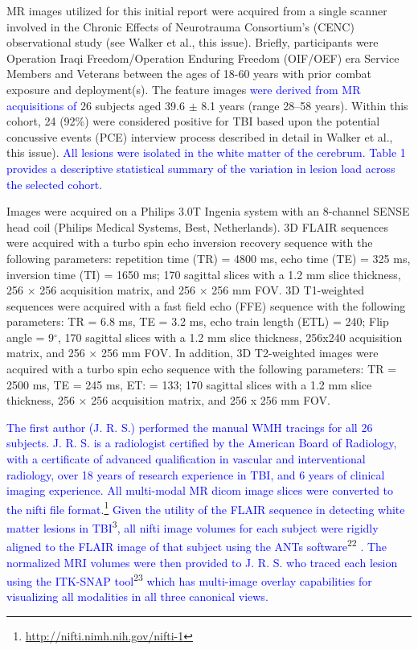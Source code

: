 \documentclass[11pt,]{article}
\let\rmarkdownfootnote\footnote%
\def\footnote{\protect\rmarkdownfootnote}
\begin{document}
MR images utilized for this initial report were acquired from a single
scanner involved in the Chronic Effects of Neurotrauma Consortium's
(CENC) observational study (see Walker et al., this issue). Briefly,
participants were Operation Iraqi Freedom/Operation Enduring Freedom
(OIF/OEF) era Service Members and Veterans between the ages of 18-60
years with prior combat exposure and deployment(s). The feature images
\textcolor{blue}{were derived from MR acquisitions of} 26 subjects aged
39.6 \(\pm\) 8.1 years (range 28--58 years). Within this cohort, 24
(92\%) were considered positive for TBI based upon the potential
concussive events (PCE) interview process described in detail in Walker
et al., this issue).
\textcolor{blue}{All lesions were isolated in the white matter of the cerebrum.  Table 1 provides a descriptive statistical summary of the variation in lesion
load across the selected cohort.}

Images were acquired on a Philips 3.0T Ingenia system with an 8-channel
SENSE head coil (Philips Medical Systems, Best, Netherlands). 3D FLAIR
sequences were acquired with a turbo spin echo inversion recovery
sequence with the following parameters: repetition time (TR) = 4800 ms,
echo time (TE) = 325 ms, inversion time (TI) = 1650 ms; 170 sagittal
slices with a 1.2 mm slice thickness, 256 \(\times\) 256 acquisition
matrix, and 256 \(\times\) 256 mm FOV. 3D T1-weighted sequences were
acquired with a fast field echo (FFE) sequence with the following
parameters: TR = 6.8 ms, TE = 3.2 ms, echo train length (ETL) = 240;
Flip angle = 9\(^\circ\), 170 sagittal slices with a 1.2 mm slice
thickness, 256x240 acquisition matrix, and 256 \(\times\) 256 mm FOV. In
addition, 3D T2-weighted images were acquired with a turbo spin echo
sequence with the following parameters: TR = 2500 ms, TE = 245 ms, ET: =
133; 170 sagittal slices with a 1.2 mm slice thickness, 256 \(\times\)
256 acquisition matrix, and 256 x 256 mm FOV.

\textcolor{blue}{The first author (J. R. S.) performed the manual WMH tracings for all 26
subjects.  J. R. S. is a radiologist certified by the American Board of Radiology, with a certificate of advanced qualification in vascular and interventional radiology, over 18 years of research experience in TBI, and 6 years of clinical imaging experience.  All
multi-modal MR dicom image slices were converted to the nifti file format}.\footnote{\url{http://nifti.nimh.nih.gov/nifti-1}}
\textcolor{blue}{Given the
utility of the FLAIR sequence in detecting white matter lesions in TBI}\textsuperscript{3}\textcolor{blue}{, all nifti image volumes for each subject were rigidly aligned to the FLAIR image of that subject using the ANTs software}\textsuperscript{22}
\textcolor{blue}{.  The normalized MRI volumes were then provided to
J. R. S. who traced each lesion using the ITK-SNAP tool}\textsuperscript{23}
\textcolor{blue}{
which has multi-image overlay capabilities for visualizing all modalities in all three
canonical views.}
\end{document}
